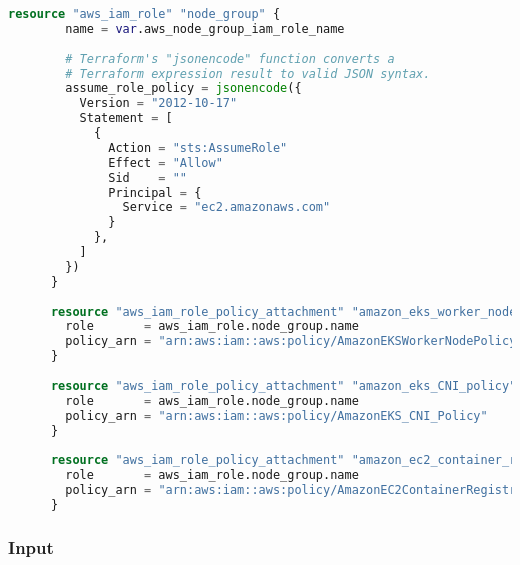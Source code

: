 \begin{lstlisting}[language=terraform]
    resource "aws_iam_role" "node_group" {
        name = var.aws_node_group_iam_role_name
      
        # Terraform's "jsonencode" function converts a
        # Terraform expression result to valid JSON syntax.
        assume_role_policy = jsonencode({
          Version = "2012-10-17"
          Statement = [
            {
              Action = "sts:AssumeRole"
              Effect = "Allow"
              Sid    = ""
              Principal = {
                Service = "ec2.amazonaws.com"
              }
            },
          ]
        })
      }
      
      resource "aws_iam_role_policy_attachment" "amazon_eks_worker_node_policy" {
        role       = aws_iam_role.node_group.name
        policy_arn = "arn:aws:iam::aws:policy/AmazonEKSWorkerNodePolicy"
      }
      
      resource "aws_iam_role_policy_attachment" "amazon_eks_CNI_policy" {
        role       = aws_iam_role.node_group.name
        policy_arn = "arn:aws:iam::aws:policy/AmazonEKS_CNI_Policy"
      }
      
      resource "aws_iam_role_policy_attachment" "amazon_ec2_container_registry_readonly" {
        role       = aws_iam_role.node_group.name
        policy_arn = "arn:aws:iam::aws:policy/AmazonEC2ContainerRegistryReadOnly"
      }    
\end{lstlisting}

\subsubsection{
{Input}}

